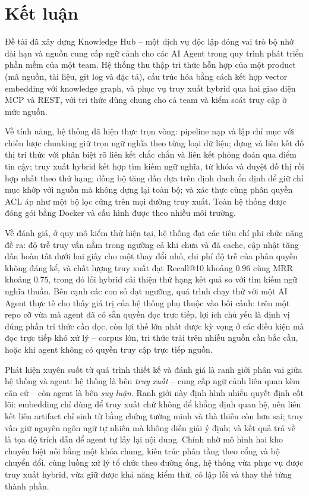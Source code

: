 \section{Kết luận}

Đề tài đã xây dựng Knowledge Hub -- một dịch vụ độc lập đóng vai trò bộ nhớ dài hạn và nguồn cung cấp ngữ cảnh cho các AI Agent trong quy trình phát triển phần mềm của một team. Hệ thống thu thập tri thức hỗn hợp của một product (mã nguồn, tài liệu, git log và đặc tả), cấu trúc hóa bằng cách kết hợp vector embedding với knowledge graph, và phục vụ truy xuất hybrid qua hai giao diện MCP và REST, với tri thức dùng chung cho cả team và kiểm soát truy cập ở mức nguồn.

Về tính năng, hệ thống đã hiện thực trọn vòng: pipeline nạp và lập chỉ mục với chiến lược chunking giữ trọn ngữ nghĩa theo từng loại dữ liệu; dựng và liên kết đồ thị tri thức với phân biệt rõ liên kết chắc chắn và liên kết phỏng đoán qua điểm tin cậy; truy xuất hybrid kết hợp tìm kiếm ngữ nghĩa, từ khóa và duyệt đồ thị rồi hợp nhất theo thứ hạng; đồng bộ tăng dần dựa trên định danh ổn định để giữ chỉ mục khớp với nguồn mà không dựng lại toàn bộ; và xác thực cùng phân quyền ACL áp như một bộ lọc cứng trên mọi đường truy xuất. Toàn hệ thống được đóng gói bằng Docker và cấu hình được theo nhiều môi trường.

Về đánh giá, ở quy mô kiểm thử hiện tại, hệ thống đạt các tiêu chí phi chức năng đề ra: độ trễ truy vấn nằm trong ngưỡng cả khi chưa và đã cache, cập nhật tăng dần hoàn tất dưới hai giây cho một thay đổi nhỏ, chi phí độ trễ của phân quyền không đáng kể, và chất lượng truy xuất đạt Recall@10 khoảng $0.96$ cùng MRR khoảng $0.75$, trong đó lối hybrid cải thiện thứ hạng kết quả so với tìm kiếm ngữ nghĩa thuần. Bên cạnh các con số đạt ngưỡng, quá trình chạy thử với một AI Agent thực tế cho thấy giá trị của hệ thống phụ thuộc vào bối cảnh: trên một repo cỡ vừa mà agent đã có sẵn quyền đọc trực tiếp, lợi ích chủ yếu là định vị đúng phần tri thức cần đọc, còn lợi thế lớn nhất được kỳ vọng ở các điều kiện mà đọc trực tiếp khó xử lý -- corpus lớn, tri thức trải trên nhiều nguồn cần bắc cầu, hoặc khi agent không có quyền truy cập trực tiếp nguồn.

Phát hiện xuyên suốt từ quá trình thiết kế và đánh giá là ranh giới phân vai giữa hệ thống và agent: hệ thống là bên \textit{truy xuất} -- cung cấp ngữ cảnh liên quan kèm căn cứ -- còn agent là bên \textit{suy luận}. Ranh giới này định hình nhiều quyết định cốt lõi: embedding chỉ dùng để truy xuất chứ không để khẳng định quan hệ, nên liên kết liên artifact chỉ sinh từ bằng chứng tường minh và thà thiếu còn hơn sai; truy vấn giữ nguyên ngôn ngữ tự nhiên mà không diễn giải ý định; và kết quả trả về là tọa độ trích dẫn để agent tự lấy lại nội dung. Chính nhờ mô hình hai kho chuyên biệt nối bằng một khóa chung, kiến trúc phân tầng theo cổng và bộ chuyển đổi, cùng luồng xử lý tổ chức theo đường ống, hệ thống vừa phục vụ được truy xuất hybrid, vừa giữ được khả năng kiểm thử, cô lập lỗi và thay thế từng thành phần.

